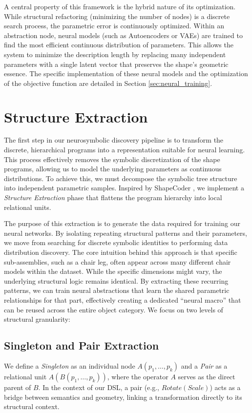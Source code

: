 \documentclass{thesis}
\begin{document}
A central property of this framework is the hybrid nature of its optimization. While structural refactoring (minimizing the number of nodes) is a discrete search process, the parametric error is continuously optimized. Within an abstraction node, neural models (such as Autoencoders or VAEs) are trained to find the most efficient continuous distribution of parameters. This allows the system to minimize the description length by replacing many independent parameters with a single latent vector that preserves the shape's geometric essence. The specific implementation of these neural models and the optimization of the objective function are detailed in Section \ref{sec:neural_training}.

\section{Structure Extraction}
The first step in our neurosymbolic discovery pipeline is to transform the discrete, hierarchical programs into a representation suitable for neural learning. This process effectively removes the symbolic discretization of the shape programs, allowing us to model the underlying parameters as continuous distributions. To achieve this, we must decompose the symbolic tree structure into independent parametric samples. Inspired by ShapeCoder \cite{ShapeCoder}, we implement a \textit{Structure Extraction} phase that flattens the program hierarchy into local relational units.

The purpose of this extraction is to generate the data required for training our neural networks. By isolating repeating structural patterns and their parameters, we move from searching for discrete symbolic identities to performing data distribution discovery. The core intuition behind this approach is that specific sub-assemblies, such as a chair leg, often appear across many different chair models within the dataset. While the specific dimensions might vary, the underlying structural logic remains identical. By extracting these recurring patterns, we can train neural abstractions that learn the shared parametric relationships for that part, effectively creating a dedicated ``neural macro'' that can be reused across the entire object category. We focus on two levels of structural granularity:

\subsection{Singleton and Pair Extraction}
We define a \textit{Singleton} as an individual node $A(p_1, \dots, p_k)$ and a \textit{Pair} as a relational unit $A(B(p_1, \dots, p_k))$, where the operator $A$ serves as the direct parent of $B$. In the context of our DSL, a pair (e.g., $Rotate(Scale)$) acts as a bridge between semantics and geometry, linking a transformation directly to its structural context.
\end{document}
